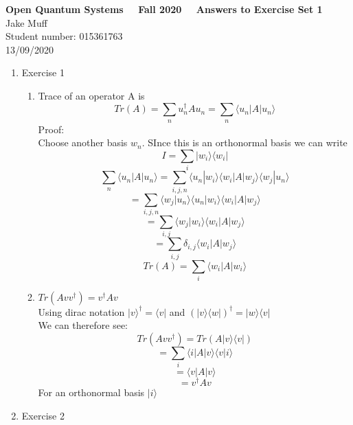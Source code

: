 \documentclass[12pt]{article}
\newcommand{\ket}[1]{\vert{#1}\rangle}
\newcommand{\bra}[1]{\langle{#1}\vert}
\begin{document}
\normalsize

\baselineskip 14pt

\begin{center}
{\Large {\bf Open Quantum Systems \ \ Fall 2020 \ \  Answers to Exercise Set 1}}\\
{\large { Jake Muff}}\\
{Student number: 015361763}\\
{13/09/2020}
\end{center}



\begin{enumerate}

\item Exercise 1
\begin{enumerate}
    \item Trace of an operator A is
     $$ Tr(A) = \sum_n u_n^\dagger A u_n = \sum_n \bra{u_n}A\ket{u_n} $$
     Proof:
     \\
     Choose another basis $w_n$. SInce this is an orthonormal basis we can write 
     $$ I= \sum_i \ket{w_i}\bra{w_i} $$
     $$\sum_n \bra{u_n}A\ket{u_n} = \sum_{i,j,n} \langle{u_n}|{w_i}\rangle\bra{w_i}A\ket{w_j}\langle w_j|u_n \rangle $$
     $$ = \sum_{i,j,n}\langle{w_j}|u_n\rangle\langle u_n|w_i\rangle\bra{w_i}A\ket{w_j} $$
     $$ = \sum_{i,j} \langle w_j|w_i\rangle\bra{w_i}A\ket{w_j} $$
     $$=\sum_{i,j} \delta_{i,j} \bra{w_i}A\ket{w_j} $$
     $$Tr(A)=\sum_i \bra{w_i}A\ket{w_i}$$
    
     \item $Tr(Avv^{\dagger})=v^\dagger A v$
     \\ Using dirac notation $\ket{v}^\dagger = \bra{v}$ and $(\ket{v}\bra{w})^\dagger = \ket{w}\bra{v}$
     \\ We can therefore see:
     $$ Tr(Avv^{\dagger}) = Tr(A\ket{v}\bra{v}) $$
     $$ = \sum_i \bra{i}A\ket{v}\langle v | i \rangle $$
     $$ = \bra{v}A\ket{v} $$
     $$ = v^\dagger A v$$
     For an orthonormal basis $\ket{i}$
\end{enumerate}

\item Exercise 2




\end{enumerate}
\end{document}
